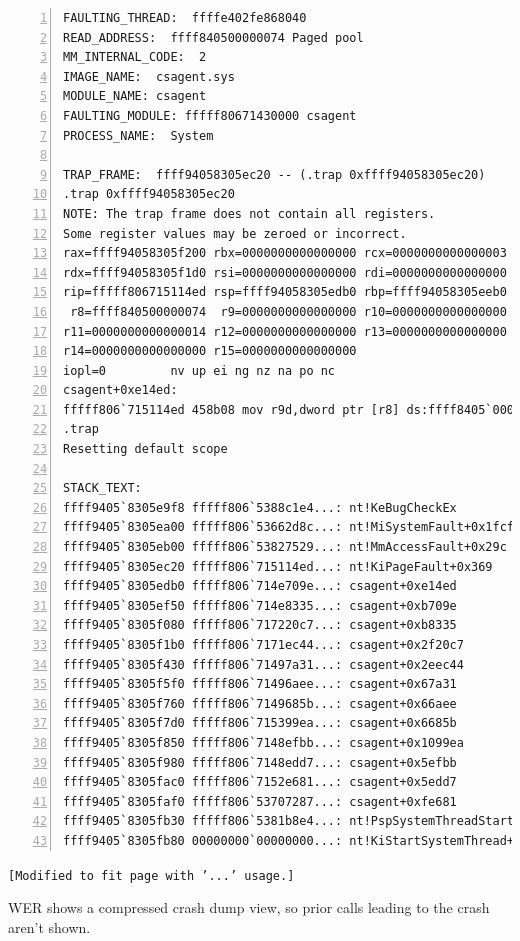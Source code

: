 \label{sec:windbg}
\begin{lstlisting}[caption=WinDBG Kernel Crash Dump, numbers=left]
FAULTING_THREAD:  ffffe402fe868040
READ_ADDRESS:  ffff840500000074 Paged pool
MM_INTERNAL_CODE:  2
IMAGE_NAME:  csagent.sys
MODULE_NAME: csagent
FAULTING_MODULE: fffff80671430000 csagent
PROCESS_NAME:  System
 
TRAP_FRAME:  ffff94058305ec20 -- (.trap 0xffff94058305ec20)
.trap 0xffff94058305ec20
NOTE: The trap frame does not contain all registers.
Some register values may be zeroed or incorrect.
rax=ffff94058305f200 rbx=0000000000000000 rcx=0000000000000003
rdx=ffff94058305f1d0 rsi=0000000000000000 rdi=0000000000000000
rip=fffff806715114ed rsp=ffff94058305edb0 rbp=ffff94058305eeb0
 r8=ffff840500000074  r9=0000000000000000 r10=0000000000000000
r11=0000000000000014 r12=0000000000000000 r13=0000000000000000
r14=0000000000000000 r15=0000000000000000
iopl=0         nv up ei ng nz na po nc
csagent+0xe14ed:
fffff806`715114ed 458b08 mov r9d,dword ptr [r8] ds:ffff8405`00000074=???... 
.trap
Resetting default scope
 
STACK_TEXT:  
ffff9405`8305e9f8 fffff806`5388c1e4...: nt!KeBugCheckEx 
ffff9405`8305ea00 fffff806`53662d8c...: nt!MiSystemFault+0x1fcf94  
ffff9405`8305eb00 fffff806`53827529...: nt!MmAccessFault+0x29c 
ffff9405`8305ec20 fffff806`715114ed...: nt!KiPageFault+0x369 
ffff9405`8305edb0 fffff806`714e709e...: csagent+0xe14ed
ffff9405`8305ef50 fffff806`714e8335...: csagent+0xb709e
ffff9405`8305f080 fffff806`717220c7...: csagent+0xb8335
ffff9405`8305f1b0 fffff806`7171ec44...: csagent+0x2f20c7
ffff9405`8305f430 fffff806`71497a31...: csagent+0x2eec44
ffff9405`8305f5f0 fffff806`71496aee...: csagent+0x67a31
ffff9405`8305f760 fffff806`7149685b...: csagent+0x66aee
ffff9405`8305f7d0 fffff806`715399ea...: csagent+0x6685b
ffff9405`8305f850 fffff806`7148efbb...: csagent+0x1099ea
ffff9405`8305f980 fffff806`7148edd7...: csagent+0x5efbb
ffff9405`8305fac0 fffff806`7152e681...: csagent+0x5edd7
ffff9405`8305faf0 fffff806`53707287...: csagent+0xfe681
ffff9405`8305fb30 fffff806`5381b8e4...: nt!PspSystemThreadStartup+0x57 
ffff9405`8305fb80 00000000`00000000...: nt!KiStartSystemThread+0x34 
\end{lstlisting}

\begin{center}
    \texttt{[Modified to fit page with '...' usage.]}
\end{center}

\newpage

\noindent
WER shows a compressed crash dump view, so prior calls leading to the crash aren't shown.

